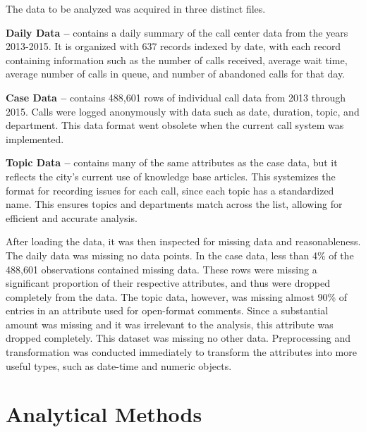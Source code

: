 \documentclass{article}
\begin{document}
The data to be analyzed was acquired in three distinct files.
\par
\textbf{Daily Data --} contains a daily summary of the call center data from the years 2013-2015.  It is organized with 637 records indexed by date, with each record containing information such as the number of calls received, average wait time, average number of calls in queue, and number of abandoned calls for that day.
\par
\textbf{Case Data --} contains 488,601 rows of individual call data from 2013 through 2015.  Calls were logged anonymously with data such as date, duration, topic, and department.  This data format went obsolete when the current call system was implemented.
\par
\textbf{Topic Data --} contains many of the same attributes as the case data, but it reflects the city's current use of knowledge base articles.  This systemizes the format for recording issues for each call, since each topic has a standardized name.  This ensures topics and departments match across the list, allowing for efficient and accurate analysis.
\par
After loading the data, it was then inspected for missing data and reasonableness.  The daily data was missing no data points.  In the case data, less than 4\% of the 488,601 observations contained missing data.  These rows were missing a significant proportion of their respective attributes, and thus were dropped completely from the data.  The topic data, however, was missing almost 90\% of entries in an attribute used for open-format comments.  Since a substantial amount was missing and it was irrelevant to the analysis, this attribute was dropped completely.  This dataset was missing no other data.  Preprocessing and transformation was conducted immediately to transform the attributes into more useful types, such as date-time and numeric objects.

\section{Analytical Methods}
\end{document}
